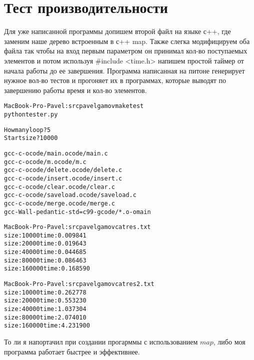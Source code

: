 \section{Тест производительности}

Для уже написанной программы допишем второй файл на языке с++, где заменим наше дерево встроенным в с++ map. Также слегка модифицируем оба файла так чтобы на вход первым параметром он принимал кол-во поступаемых элементов и потом используя \#include <time.h> напишем простой таймер от начала работы до ее завершения. Программа написанная на питоне генерирует нужное вол-во тестов и прогоняет их в программах, которые выводят по завершению работы время и кол-во элементов. 

\begin{alltt}
MacBook-Pro-Pavel:src pavelgamov make test
python tester.py

How many loop?	5
Start size?	10000

gcc    -c -o code/main.o code/main.c
gcc    -c -o code/m.o code/m.c
gcc    -c -o code/delete.o code/delete.c
gcc    -c -o code/insert.o code/insert.c
gcc    -c -o code/clear.o code/clear.c
gcc    -c -o code/saveload.o code/saveload.c
gcc    -c -o code/merge.o code/merge.c
gcc -Wall -pedantic -std=c99 -g code/*.o -o main

MacBook-Pro-Pavel:src pavelgamov cat res.txt 
size:  10000		time:  0.009841
size:  20000		time:  0.019643
size:  40000		time:  0.044685
size:  80000		time:  0.086463
size:  160000		time:  0.168590

MacBook-Pro-Pavel:src pavelgamov cat res2.txt
size:  10000		time:  0.262778
size:  20000		time:  0.553230
size:  40000		time:  1.037304
size:  80000		time:  2.074010
size:  160000		time:  4.231900
\end{alltt}

То ли я напортачил при создании прогарммы с использованием $map$, либо моя программа работает быстрее и эффективнее.

\pagebreak
